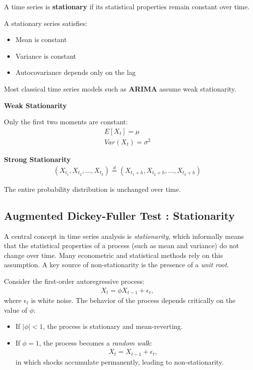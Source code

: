 \documentclass[10pt,a4paper]{article}
\begin{document}
	A time series is \textbf{stationary} if its statistical properties remain constant over time.
	
	A stationary series satisfies:
	
	
	\begin{itemize}
	\item Mean is constant
	\item Variance is constant
	\item Autocovariance depends only on the lag
	\end{itemize}
	
	
	Most classical time series models such as \textbf{ARIMA} assume weak stationarity.
	
	
	\textbf{Weak Stationarity}
	
	Only the first two moments are constant:
	\begin{align*}
	E[X_t] = \mu \\
	Var(X_t) = \sigma^2
	\end{align*}
	
	
	
	\textbf{Strong Stationarity}
	\begin{align*}
	(X_{t_1}, X_{t_2}, ..., X_{t_k})
	\overset{d}{=}
	(X_{t_1+h}, X_{t_2+h}, ..., X_{t_k+h})
	\end{align*}
	
	The entire probability distribution is unchanged over time.
	
	\subsection{Augmented Dickey-Fuller Test : Stationarity}
	
	A central concept in time series analysis is \textit{stationarity}, which informally means that the statistical properties of a process (such as mean and variance) do not change over time. Many econometric and statistical methods rely on this assumption. A key source of non-stationarity is the presence of a \textit{unit root}.
	
	Consider the first-order autoregressive process:
	\begin{align*}
	X_t = \phi X_{t-1} + \epsilon_t,
	\end{align*}
	where $\epsilon_t$ is white noise. The behavior of the process depends critically on the value of $\phi$:
	\begin{itemize}
	\item If $|\phi| < 1$, the process is stationary and mean-reverting.
	\item If $\phi = 1$, the process becomes a \textit{random walk}:
	\begin{align*}
	X_t = X_{t-1} + \epsilon_t,
	\end{align*}
	in which shocks accumulate permanently, leading to non-stationarity.
	\end{itemize}
	
\end{document}
